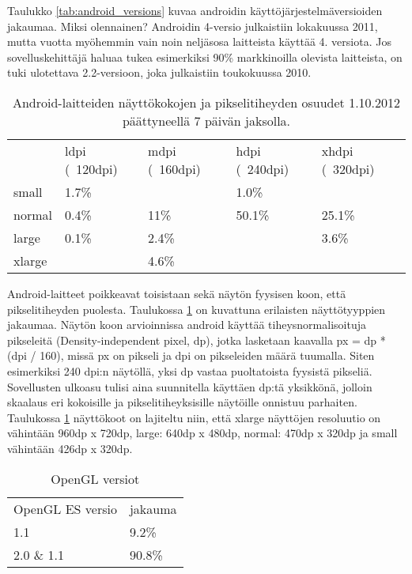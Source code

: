 Taulukko \ref{tab:android_versions} kuvaa androidin käyttöjärjestelmäversioiden jakaumaa. Miksi olennainen? Androidin 4-versio julkaistiin lokakuussa 2011, mutta vuotta myöhemmin vain noin neljäsosa laitteista käyttää 4. versiota. Jos sovelluskehittäjä haluaa tukea esimerkiksi 90\% markkinoilla olevista laitteista, on tuki ulotettava 2.2-versioon, joka julkaistiin toukokuussa 2010. \cite{android_version_history}

\begin{table}[h]
\centering
\begin{tabular}{ l l l l l }
   & ldpi (~120dpi) & mdpi (~160dpi) & hdpi (~240dpi) & xhdpi (~320dpi) \\
  small & 1.7\% &  & 1.0\% &  \\
  normal & 0.4\% & 11\% & 50.1\% & 25.1\% \\
  large & 0.1\% & 2.4\% &  & 3.6\% \\
  xlarge &  & 4.6\% &  &  \\
\end{tabular}
\caption{Android-laitteiden näyttökokojen ja pikselitiheyden osuudet 1.10.2012 päättyneellä 7 päivän jaksolla.}
\label{tab:screen_sizes}
\end{table}

Android-laitteet poikkeavat toisistaan sekä näytön fyysisen koon, että pikselitiheyden puolesta. Taulukossa \ref{tab:screen_sizes} on kuvattuna erilaisten näyttötyyppien jakaumaa. Näytön koon arvioinnissa android käyttää tiheysnormalisoituja pikseleitä (Density-independent pixel, dp), jotka lasketaan kaavalla px = dp * (dpi / 160), missä px on pikseli ja dpi on pikseleiden määrä tuumalla. Siten esimerkiksi 240 dpi:n näytöllä, yksi dp vastaa puoltatoista fyysistä pikseliä. Sovellusten ulkoasu tulisi aina suunnitella käyttäen dp:tä yksikkönä, jolloin skaalaus eri kokoisille ja pikselitiheyksisille näytöille onnistuu parhaiten. Taulukossa \ref{tab:screen_sizes} näyttökoot on lajiteltu niin, että xlarge näyttöjen resoluutio on vähintään 960dp x 720dp, large: 640dp x 480dp, normal: 470dp x 320dp ja small vähintään 426dp x 320dp.

\begin{table}[h]
\centering
\begin{tabular}{ l l }
  OpenGL ES versio & jakauma \\
  1.1 & 9.2\% \\
  2.0 \& 1.1 & 90.8\% \\
\end{tabular}
\caption{OpenGL versiot}
\label{tab:opengl_versions}
\end{table}

